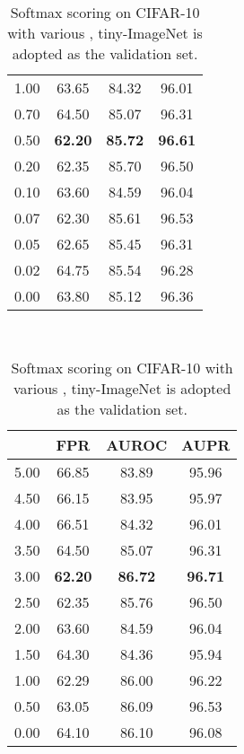 \documentclass{article}
\begin{document}
\begin{table}[t]
{{\begin{tabular}{c|ccc}
1.00               & 63.65                  & {84.32}                  & {96.01}       \\
0.70               & 64.50                  & 85.07                  & 96.31       \\
\cellcolor{greyC}0.50               & \cellcolor{greyC}\textbf{62.20}                  & \cellcolor{greyC}\textbf{85.72}                  & \cellcolor{greyC}\textbf{96.61}       \\ 
0.20               & 62.35                  & 85.70                  & 96.50       \\
0.10               & 63.60                  & 84.59                  & 96.04       \\
0.07               & 62.30                  & 85.61                  & 96.53       \\
0.05               & 62.65                  & 85.45                  & 96.31       \\ 
0.02               & 64.75                  & 85.54                  & 96.28       \\
0.00               & 63.80                  & 85.12                  & 96.36       \\
\bottomrule[1.5pt]      
\end{tabular}
}
}~~
\parbox{.30\linewidth}{
\centering
\caption{Softmax scoring on CIFAR-10 with various , tiny-ImageNet is adopted as the validation set.}
\scriptsize
\vspace{5pt}
{
\begin{tabular}{c|ccc}
\toprule[1.5pt]
             & FPR     & AUROC       & AUPR     \\
\midrule[0.6pt]
5.00               & 66.85                  & 83.89                  & 95.96 \\
4.50               & 66.15                  & 83.95                  & 95.97 \\
4.00               & 66.51                  & 84.32                  & 96.01 \\
3.50               & 64.50                  & 85.07                  & 96.31      \\
\cellcolor{greyC}3.00               & \cellcolor{greyC}\textbf{62.20}                  & \cellcolor{greyC}\textbf{86.72}                  & \cellcolor{greyC}\textbf{96.71} \\
2.50               & 62.35                  & 85.76                  & 96.50 \\
2.00               & 63.60                  & 84.59                  & 96.04 \\
1.50               & 64.30                  & 84.36                  & 95.94 \\
1.00               & 62.29                  & 86.00                  & 96.22 \\
0.50               & 63.05                  & 86.09                  & 96.53 \\
0.00               & 64.10                  & 86.10                 & 96.08       \\
\bottomrule[1.5pt]      
\end{tabular}
}
}
\end{table}
\end{document}
